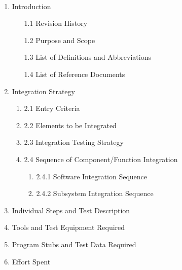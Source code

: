 \documentclass{article}
\begin{document}
 \\    %
\begin{enumerate}

\item Introduction




\begin {enumerate}
\item [1.1] Revision History
\item [1.2] Purpose and Scope
\item [1.3] List of Definitions and Abbreviations 
\item [1.4] List of Reference Documents

\end{enumerate}

\item Integration Strategy 
\begin {enumerate}
\item [2.1] Entry Criteria
\item [2.2] Elements to be Integrated 
\item [2.3] Integration Testing Strategy
\item [2.4] Sequence of Component/Function Integration 
\begin {enumerate}
\item [2.4.1] Software  Integration  Sequence
\item [2.4.2] Subsystem  Integration  Sequence
\end {enumerate} 

\end {enumerate} 


\item Individual Steps and Test Description



\item Tools and Test Equipment Required  



\item Program Stubs and Test Data Required 



\item Effort Spent 

\end{enumerate}
\end{document}
